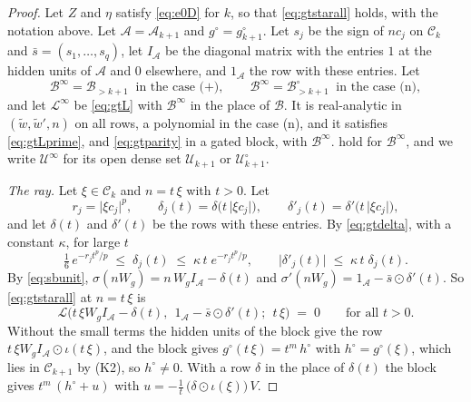 \documentclass[10pt]{article}
\theoremstyle{definition}
\theoremstyle{remark}
\begin{document}
\begin{proof}
Let $Z$ and $\eta$ satisfy \eqref{eq:e0D} for $k$, so that \eqref{eq:gtstarall} holds, with the notation above. Let $\mathcal A = \mathcal A_{k+1}$ and $g^\circ = g^\circ_{k+1}$. Let $s_j$ be the sign of $nc_j$ on $\mathcal C_k$ and $\bar s = (s_1, \dots, s_q)$, let $I_{\mathcal A}$ be the diagonal matrix with the entries $1$ at the hidden units of $\mathcal A$ and $0$ elsewhere, and $1_{\mathcal A}$ the row with these entries. Let
\[
\mathcal B^\infty = \mathcal B_{>k+1} \ \text{ in the case (+)}, \qquad \mathcal B^\infty = \mathcal B^\circ_{>k+1} \ \text{ in the case (n)},
\]
and let $\mathcal L^\infty$ be \eqref{eq:gtL} with $\mathcal B^\infty$ in the place of $\mathcal B$. It is real-analytic in $(\tilde w, \tilde w', n)$ on all rows, a polynomial in the case (n), and it satisfies \eqref{eq:gtLprime}, and \eqref{eq:gtparity} in a gated block, with $\mathcal B^\infty$.  hold for $\mathcal B^\infty$, and we write $\mathcal U^\infty$ for its open dense set $\mathcal U_{k+1}$ or $\mathcal U^\circ_{k+1}$.

\emph{The ray.} Let $\xi \in \mathcal C_k$ and $n = t\,\xi$ with $t > 0$. Let
\[
r_j = \lvert\xi c_j\rvert^p, \qquad \delta_j(t) = \delta\big(t\,\lvert\xi c_j\rvert\big), \qquad \delta'_j(t) = \delta'\big(t\,\lvert\xi c_j\rvert\big),
\]
and let $\delta(t)$ and $\delta'(t)$ be the rows with these entries. By \eqref{eq:gtdelta}, with a constant $\kappa$, for large $t$
\begin{equation}\label{eq:gtsizes}
\tfrac16\,e^{-r_jt^p/p} \;\le\; \delta_j(t) \;\le\; \kappa\,t\;e^{-r_jt^p/p}, \qquad \lvert\delta'_j(t)\rvert \;\le\; \kappa\,t\;\delta_j(t) .
\end{equation}
By \eqref{eq:sbunit}, $\sigma(nW_g) = n\,W_gI_{\mathcal A} - \delta(t)$ and $\sigma'(nW_g) = 1_{\mathcal A} - \bar s\odot\delta'(t)$. So \eqref{eq:gtstarall} at $n = t\,\xi$ is
\begin{equation}\label{eq:gtray}
\mathcal L\big(t\,\xi W_gI_{\mathcal A} - \delta(t),\ \ 1_{\mathcal A} - \bar s\odot\delta'(t);\ \ t\,\xi\big) \;=\; 0 \qquad\text{for all } t > 0 .
\end{equation}
Without the small terms the hidden units of the block give the row $t\,\xi W_gI_{\mathcal A}\odot\iota(t\,\xi)$, and the block gives $g^\circ(t\,\xi) = t^m\,h^\circ$ with $h^\circ = g^\circ(\xi)$, which lies in $\mathcal C_{k+1}$ by (K2), so $h^\circ \neq 0$. With a row $\delta$ in the place of $\delta(t)$ the block gives $t^m\,(h^\circ + u)$ with $u = -\frac1t\,\big(\delta\odot\iota(\xi)\big)\,V$.


\end{proof}
\end{document}
